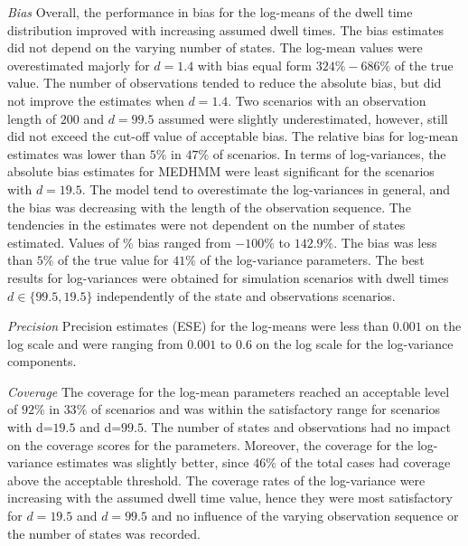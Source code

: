 \emph{Bias}     Overall, the performance in bias for the log-means of the dwell time distribution improved with increasing assumed dwell times. The bias estimates did not depend on the varying number of states. The log-mean values were overestimated majorly for $d=1.4$ with bias equal form $324\%-686\%$ of the true value. The number of observations tended to reduce the absolute bias, but did not improve the estimates when $d=1.4$. Two scenarios with an observation length of $200$ and $d=99.5$ assumed were slightly underestimated, however, still did not exceed the cut-off value of acceptable bias. The relative bias for log-mean estimates was lower than $5\%$ in $47\%$ of scenarios. In terms of log-variances, the absolute bias estimates for MEDHMM were least significant for the scenarios with $d=19.5$. The model tend to overestimate the log-variances in general, and the bias was decreasing with the length of the observation sequence. The tendencies in the estimates were not dependent on the number of states estimated. Values of \% bias ranged from $-100\%$ to $142.9\%$. The bias was less than $5\%$ of the true value for $41\%$ of the log-variance parameters. The best results for log-variances were obtained for simulation scenarios with dwell times $d\in\{99.5, 19.5\}$ independently of the state and observations scenarios.

\emph{Precision}    Precision estimates (ESE) for the log-means were less than $0.001$ on the log scale and were ranging from $0.001$ to $0.6$ on the log scale for the log-variance components.

\emph{Coverage}     The coverage for the log-mean parameters reached an acceptable level of $92\%$ in $33\%$ of scenarios and was within the satisfactory range for scenarios with d=$19.5$ and d=$99.5$. The number of states and observations had no impact on the coverage scores for the parameters. Moreover, the coverage for the log-variance estimates was slightly better, since $46\%$ of the total cases had coverage above the acceptable threshold. The coverage rates of the log-variance were increasing with the assumed dwell time value, hence they were most satisfactory for $d=19.5$ and $d=99.5$ and no influence of the varying observation sequence or the number of states was recorded. 

